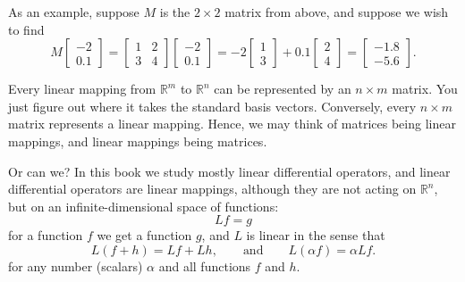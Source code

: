 As an example, suppose $M$ is the $2 \times 2$ matrix from above, and
suppose we wish to find
\begin{equation*}
M
\begin{bmatrix}
-2 \\ 0.1
\end{bmatrix}
=
\begin{bmatrix}
1 & 2 \\
3 & 4
\end{bmatrix}
\begin{bmatrix}
-2 \\ 0.1
\end{bmatrix}
=
-2
\begin{bmatrix}
1 \\ 3
\end{bmatrix}
+
0.1
\begin{bmatrix}
2 \\ 4
\end{bmatrix}
=
\begin{bmatrix}
-1.8 \\ -5.6
\end{bmatrix} .
\end{equation*}

Every linear mapping from ${\mathbb R}^m$ to ${\mathbb R}^n$ can be
represented by an $n \times m$ matrix.  You just figure out where it
takes the standard basis vectors.  Conversely, every $n \times m$ matrix
represents a linear mapping.  Hence, we may think of matrices being
linear mappings, and linear mappings being matrices.

Or can we?  In this book we study mostly linear differential operators,
and linear differential operators are linear mappings, although they are
not acting on ${\mathbb R}^n$, but on 
an infinite-dimensional space of functions:
\begin{equation*}
L f = g
\end{equation*}
for a function $f$ we get a function $g$, and $L$ is linear in the sense that
\begin{equation*}
L ( f + h) = Lf + Lh, \qquad \text{and} \qquad
L (\alpha f) = \alpha Lf .
\end{equation*}
for any number (scalars) $\alpha$ and all functions $f$ and $h$.

